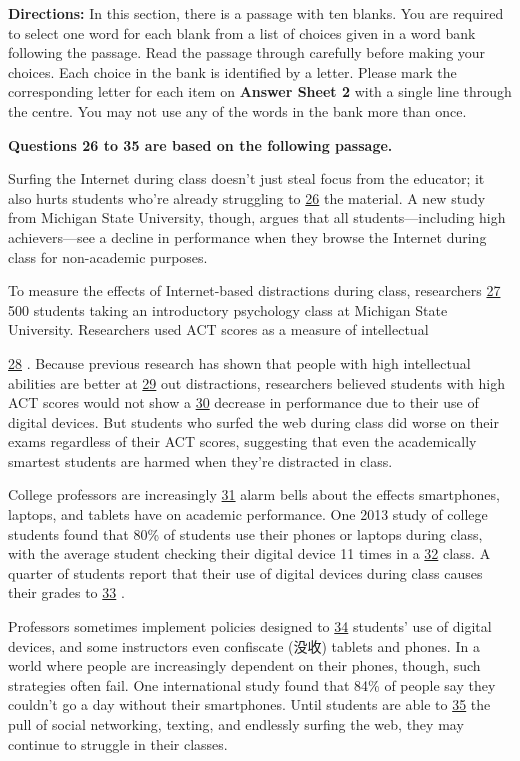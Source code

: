 \documentclass[UTF8,11pt]{ctexart}
\begin{document}
\textbf{Directions:} In this section, there is a passage with ten blanks. You are required to select one word for each blank from a list of choices given in a word bank following the passage. Read the passage through carefully before making your choices. Each choice in the bank is identified by a letter. Please mark the corresponding letter for each item on\textbf{ Answer Sheet 2} with a single line through the centre. You may not use any of the words in the bank more than once.


\textbf{Questions 26 to 35 are based on the following passage.}


Surfing the Internet during class doesn't just steal focus from the educator; it also hurts students who're already struggling to \uline{26} the material. A new study from Michigan State University, though, argues that all students—including high achievers—see a decline in performance when they browse the Internet during class for non-academic purposes.


To measure the effects of Internet-based distractions during class, researchers \uline{27} 500 students taking an introductory psychology class at Michigan State University. Researchers used ACT scores as a measure of intellectual


\uline{28} . Because previous research has shown that people with high intellectual abilities are better at \uline{29} out distractions, researchers believed students with high ACT scores would not show a \uline{30} decrease in performance due to their use of digital devices. But students who surfed the web during class did worse on their exams regardless of their ACT scores, suggesting that even the academically smartest students are harmed when they're distracted in class.


College professors are increasingly \uline{31} alarm bells about the effects smartphones, laptops, and tablets have on academic performance. One 2013 study of college students found that 80\% of students use their phones or laptops during class, with the average student checking their digital device 11 times in a \uline{32} class. A quarter of students report that their use of digital devices during class causes their grades to \uline{33} .


Professors sometimes implement policies designed to \uline{34} students' use of digital devices, and some instructors even confiscate (没收) tablets and phones. In a world where people are increasingly dependent on their phones, though, such strategies often fail. One international study found that 84\% of people say they couldn't go a day without their smartphones. Until students are able to \uline{35} the pull of social networking, texting, and endlessly surfing the web, they may continue to struggle in their classes.
\end{document}
